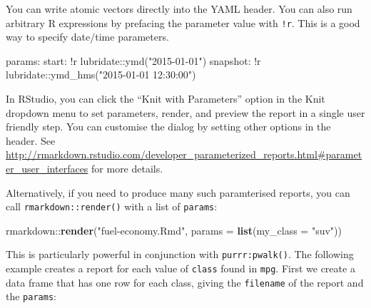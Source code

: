 \documentclass[]{book}
\newenvironment{Shaded}{\begin{snugshade}}{\end{snugshade}}
\newcommand{\KeywordTok}[1]{\textcolor[rgb]{0.13,0.29,0.53}{\textbf{{#1}}}}
\newcommand{\DataTypeTok}[1]{\textcolor[rgb]{0.13,0.29,0.53}{{#1}}}
\newcommand{\StringTok}[1]{\textcolor[rgb]{0.31,0.60,0.02}{{#1}}}
\newcommand{\FunctionTok}[1]{\textcolor[rgb]{0.00,0.00,0.00}{{#1}}}
\newcommand{\NormalTok}[1]{{#1}}
\begin{document}
You can write atomic vectors directly into the YAML header. You can also
run arbitrary R expressions by prefacing the parameter value with
\texttt{!r}. This is a good way to specify date/time parameters.

\begin{Shaded}
\begin{Highlighting}[]
\FunctionTok{params:}
  \FunctionTok{start:} \NormalTok{!r lubridate::ymd("2015-01-01")}
  \FunctionTok{snapshot:} \NormalTok{!r lubridate::ymd_hms("2015-01-01 12:30:00")}
\end{Highlighting}
\end{Shaded}

In RStudio, you can click the ``Knit with Parameters'' option in the
Knit dropdown menu to set parameters, render, and preview the report in
a single user friendly step. You can customise the dialog by setting
other options in the header. See
\url{http://rmarkdown.rstudio.com/developer_parameterized_reports.html\#parameter_user_interfaces}
for more details.

Alternatively, if you need to produce many such paramterised reports,
you can call \texttt{rmarkdown::render()} with a list of
\texttt{params}:

\begin{Shaded}
\begin{Highlighting}[]
\NormalTok{rmarkdown::}\KeywordTok{render}\NormalTok{(}\StringTok{"fuel-economy.Rmd"}\NormalTok{, }\DataTypeTok{params =} \KeywordTok{list}\NormalTok{(}\DataTypeTok{my_class =} \StringTok{"suv"}\NormalTok{))}
\end{Highlighting}
\end{Shaded}

This is particularly powerful in conjunction with
\texttt{purrr:pwalk()}. The following example creates a report for each
value of \texttt{class} found in \texttt{mpg}. First we create a data
frame that has one row for each class, giving the \texttt{filename} of
the report and the \texttt{params}:
\end{document}
